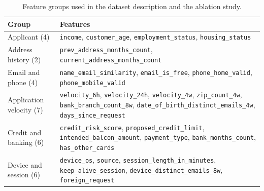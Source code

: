 \begin{table}[!t]
\centering
\caption{Feature groups used in the dataset description and the ablation study.}
\label{tab:groups}
\footnotesize
\setlength{\tabcolsep}{3.5pt}
\begin{tabular}{>{\raggedright\arraybackslash}p{1.55cm}>{\raggedright\arraybackslash}p{6.3cm}}
\hline
Group & Features \\
\hline
Applicant (4) & \texttt{\footnotesize income}, \texttt{\footnotesize customer\_\allowbreak age}, \texttt{\footnotesize employment\_\allowbreak status}, \texttt{\footnotesize housing\_\allowbreak status} \\
Address history (2) & \texttt{\footnotesize prev\_\allowbreak address\_\allowbreak months\_\allowbreak count}, \texttt{\footnotesize current\_\allowbreak address\_\allowbreak months\_\allowbreak count} \\
Email and phone (4) & \texttt{\footnotesize name\_\allowbreak email\_\allowbreak similarity}, \texttt{\footnotesize email\_\allowbreak is\_\allowbreak free}, \texttt{\footnotesize phone\_\allowbreak home\_\allowbreak valid}, \texttt{\footnotesize phone\_\allowbreak mobile\_\allowbreak valid} \\
Application velocity (7) & \texttt{\footnotesize velocity\_\allowbreak 6h}, \texttt{\footnotesize velocity\_\allowbreak 24h}, \texttt{\footnotesize velocity\_\allowbreak 4w}, \texttt{\footnotesize zip\_\allowbreak count\_\allowbreak 4w}, \texttt{\footnotesize bank\_\allowbreak branch\_\allowbreak count\_\allowbreak 8w}, \texttt{\footnotesize date\_\allowbreak of\_\allowbreak birth\_\allowbreak distinct\_\allowbreak emails\_\allowbreak 4w}, \texttt{\footnotesize days\_\allowbreak since\_\allowbreak request} \\
Credit and banking (6) & \texttt{\footnotesize credit\_\allowbreak risk\_\allowbreak score}, \texttt{\footnotesize proposed\_\allowbreak credit\_\allowbreak limit}, \texttt{\footnotesize intended\_\allowbreak balcon\_\allowbreak amount}, \texttt{\footnotesize payment\_\allowbreak type}, \texttt{\footnotesize bank\_\allowbreak months\_\allowbreak count}, \texttt{\footnotesize has\_\allowbreak other\_\allowbreak cards} \\
Device and session (6) & \texttt{\footnotesize device\_\allowbreak os}, \texttt{\footnotesize source}, \texttt{\footnotesize session\_\allowbreak length\_\allowbreak in\_\allowbreak minutes}, \texttt{\footnotesize keep\_\allowbreak alive\_\allowbreak session}, \texttt{\footnotesize device\_\allowbreak distinct\_\allowbreak emails\_\allowbreak 8w}, \texttt{\footnotesize foreign\_\allowbreak request} \\
\hline
\end{tabular}
\end{table}
